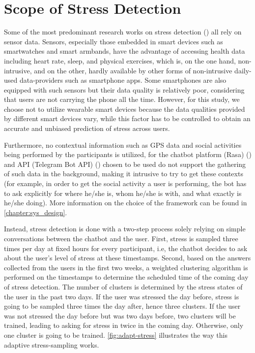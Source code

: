 \section{Scope of Stress Detection}
Some of the most predominant research works on stress detection (\cite{7_stress_detection, 8_stress_detection, 9_stress_detection}) all rely on sensor data. Sensors, especially those embedded in smart devices such as smartwatches and smart armbands, have the advantage of accessing health data including heart rate, sleep, and physical exercises, which is, on the one hand, non-intrusive, and on the other, hardly available by other forms of non-intrusive daily-used data-providers such as smartphone apps. Some smartphones are also equipped with such sensors but their data quality is relatively poor, considering that users are not carrying the phone all the time. However, for this study, we choose not to utilize wearable smart devices because the data qualities provided by different smart devices vary, while this factor has to be controlled to obtain an accurate and unbiased prediction of stress across users.

Furthermore, no contextual information such as GPS data and social activities being performed by the participants is utilized, for the chatbot platform (Rasa) (\cite{10_rasa}) and API (Telegram Bot API) (\cite{11_tg_bot_api}) chosen to be used do not support the gathering of such data in the background, making it intrusive to try to get these contexts (for example, in order to get the social activity a user is performing, the bot has to ask explicitly for where he/she is, whom he/she is with, and what exactly is he/she doing). More information on the choice of the framework can be found in \autoref{chapter:sys_design}. \bigskip

Instead, stress detection is done with a two-step process solely relying on simple conversations between the chatbot and the user. First, stress is sampled three times per day at fixed hours for every participant, i.e, the chatbot decides to ask about the user’s level of stress at these timestamps. Second, based on the answers collected from the users in the first two weeks, a weighted clustering algorithm is performed on the timestamps to determine the scheduled time of the coming day of stress detection. The number of clusters is determined by the stress states of the user in the past two days. If the user was stressed the day before, stress is going to be sampled three times the day after, hence three clusters. If the user was not stressed the day before but was two days before, two clusters will be trained, leading to asking for stress in twice in the coming day. Otherwise, only one cluster is going to be trained. \autoref{fig:adapt-stress} illustrates the way this adaptive stress-sampling works.

